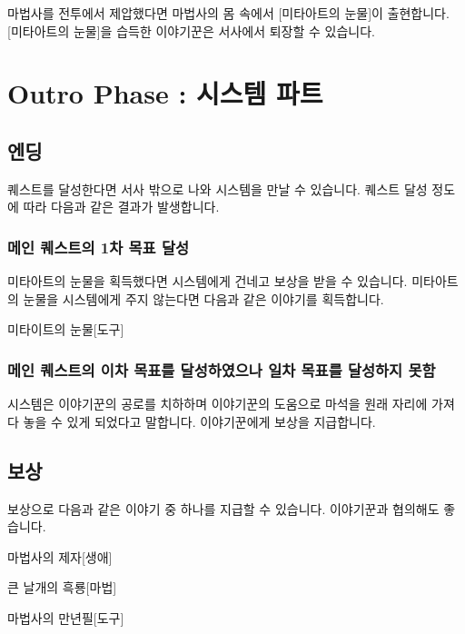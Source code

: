 \documentclass{report}
\begin{document}
				마법사를 전투에서 제압했다면 마법사의 몸 속에서 [미타아트의 눈물]이 출현합니다. [미타아트의 눈물]을 습득한 이야기꾼은 서사에서 퇴장할 수 있습니다.
	
	\section{Outro Phase : 시스템 파트}
		\subsection{엔딩}
			퀘스트를 달성한다면 서사 밖으로 나와 시스템을 만날 수 있습니다. 퀘스트 달성 정도에 따라 다음과 같은 결과가 발생합니다.
			
			\subsubsection*{메인 퀘스트의 1차  목표 달성}
				미타아트의 눈물을 획득했다면 시스템에게 건네고 보상을 받을 수 있습니다. 미타아트의 눈물을 시스템에게 주지 않는다면 다음과 같은 이야기를 획득합니다.
				
				\begin{spoiler}{미타이트의 눈물}{[도구]}
				\end{spoiler}
				
			\subsubsection*{메인 퀘스트의 이차 목표를 달성하였으나 일차 목표를 달성하지 못함}
				시스템은 이야기꾼의 공로를 치하하며 이야기꾼의 도움으로 마석을 원래 자리에 가져다 놓을 수 있게 되었다고 말합니다. 이야기꾼에게 보상을 지급합니다.
		\subsection{보상}
			보상으로 다음과 같은 이야기 중 하나를 지급할 수 있습니다. 이야기꾼과 협의해도 좋습니다.
			
			\begin{spoiler}{마법사의 제자}{[생애]}
			\end{spoiler}
			
			\begin{spoiler}{큰 날개의 흑룡}{[마법]}
			\end{spoiler}
			
			\begin{spoiler}{마법사의 만년필}{[도구]}
			\end{spoiler}
\end{document}
